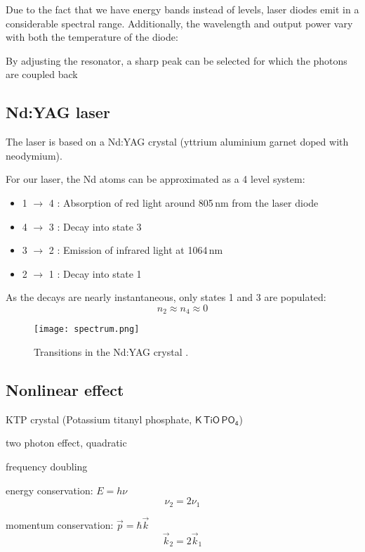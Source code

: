 Due to the fact that we have energy bands instead of levels, laser diodes emit in a considerable spectral range. Additionally, the wavelength and output power vary with both the temperature of the diode:

By adjusting the resonator, a sharp peak can be selected for which the photons are coupled back 

\subsection{Nd:YAG laser}
The laser is based on a Nd:YAG crystal (yttrium aluminium garnet doped with neodymium).

For our laser, the \textsf{Nd} atoms can be approximated as a 4 level system:
\begin{itemize}
\item 1 $\rightarrow$ 4 : Absorption of red light around 805\,nm from the laser diode
\item 4 $\rightarrow$ 3 : Decay into state 3
\item 3 $\rightarrow$ 2 : Emission of infrared light at 1064\,nm
\item 2 $\rightarrow$ 1 : Decay into state 1
\end{itemize}


As the decays are nearly instantaneous, only states 1 and 3 are populated:
\begin{equation}
n_2 \approx n_4 \approx 0
\end{equation}

\begin{figure}[h]
	\centering
	\texttt{[image: spectrum.png]}
	\caption{Transitions in the Nd:YAG crystal \cite{lit:leybold}.}
	\label{fig:spectrum}
\end{figure}


\subsection{Nonlinear effect}
KTP crystal (Potassium titanyl phosphate, $\mathsf{K\,TiO\,PO_4}$)

two photon effect, quadratic

frequency doubling

energy conservation: $E = h \nu$
\begin{equation}
	\nu_2 = 2 \nu_1
\end{equation}

momentum conservation: $\vec p = \hbar \vec k$
\begin{equation}
	\vec k_2 = 2 \vec k_1
\end{equation}

